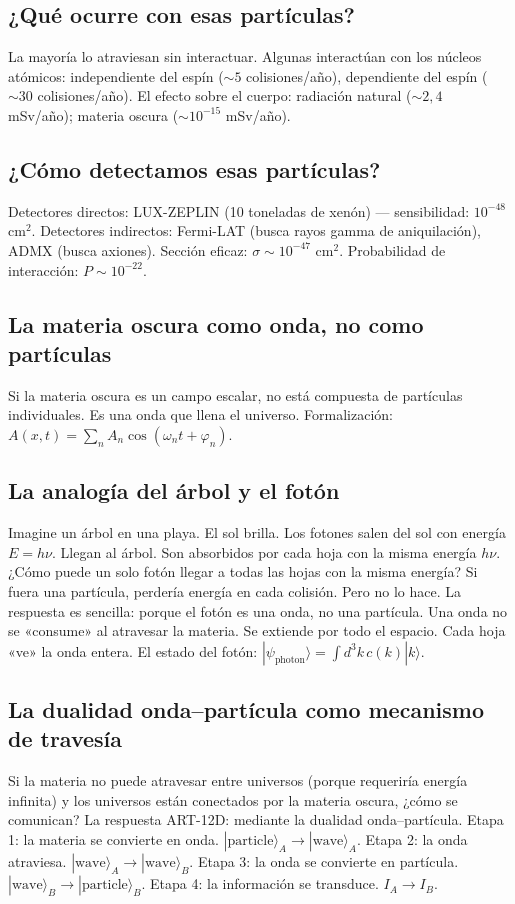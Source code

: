 \subsection{¿Qué ocurre con esas partículas?}
La mayoría lo atraviesan sin interactuar. Algunas interactúan con los núcleos atómicos: independiente del espín ($\sim 5$ colisiones/año), dependiente del espín ($\sim 30$ colisiones/año). El efecto sobre el cuerpo: radiación natural ($\sim 2,4$ mSv/año); materia oscura ($\sim 10^{-15}$ mSv/año).

\subsection{¿Cómo detectamos esas partículas?}
Detectores directos: LUX-ZEPLIN (10 toneladas de xenón) --- sensibilidad: $10^{-48}$ cm$^2$. Detectores indirectos: Fermi-LAT (busca rayos gamma de aniquilación), ADMX (busca axiones). Sección eficaz: $\sigma \sim 10^{-47}$ cm$^2$. Probabilidad de interacción: $P \sim 10^{-22}$.

\subsection{La materia oscura como onda, no como partículas}
Si la materia oscura es un campo escalar, no está compuesta de partículas individuales. Es una onda que llena el universo. Formalización: $A(x,t) = \sum_n A_n \cos(\omega_n t + \varphi_n)$.

\subsection{La analogía del árbol y el fotón}
Imagine un árbol en una playa. El sol brilla. Los fotones salen del sol con energía $E = h\nu$. Llegan al árbol. Son absorbidos por cada hoja con la misma energía $h\nu$. ¿Cómo puede un solo fotón llegar a todas las hojas con la misma energía? Si fuera una partícula, perdería energía en cada colisión. Pero no lo hace. La respuesta es sencilla: porque el fotón es una onda, no una partícula. Una onda no se «consume» al atravesar la materia. Se extiende por todo el espacio. Cada hoja «ve» la onda entera. El estado del fotón: $|\psi_{\text{photon}}\rangle = \int d^3k \, c(k) |k\rangle$.

\subsection{La dualidad onda--partícula como mecanismo de travesía}
Si la materia no puede atravesar entre universos (porque requeriría energía infinita) y los universos están conectados por la materia oscura, ¿cómo se comunican? La respuesta ART-12D: mediante la dualidad onda--partícula. Etapa 1: la materia se convierte en onda. $|\text{particle}\rangle_A \to |\text{wave}\rangle_A$. Etapa 2: la onda atraviesa. $|\text{wave}\rangle_A \to |\text{wave}\rangle_B$. Etapa 3: la onda se convierte en partícula. $|\text{wave}\rangle_B \to |\text{particle}\rangle_B$. Etapa 4: la información se transduce. $I_A \to I_B$.

